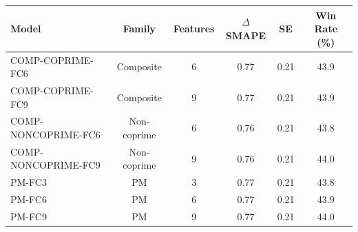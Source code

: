 \begin{tabular}{|l|c|c|c|c|c|}
\hline
Model & Family & Features & $\Delta$SMAPE & SE & Win Rate (\%) \\
\hline
COMP-COPRIME-FC6 & Composite & 6 & 0.77 & 0.21 & 43.9 \\
COMP-COPRIME-FC9 & Composite & 9 & 0.77 & 0.21 & 43.9 \\
COMP-NONCOPRIME-FC6 & Non-coprime & 6 & 0.76 & 0.21 & 43.8 \\
COMP-NONCOPRIME-FC9 & Non-coprime & 9 & 0.76 & 0.21 & 44.0 \\
PM-FC3 & PM & 3 & 0.77 & 0.21 & 43.8 \\
PM-FC6 & PM & 6 & 0.77 & 0.21 & 43.9 \\
PM-FC9 & PM & 9 & 0.77 & 0.21 & 44.0 \\
\hline
\end{tabular}